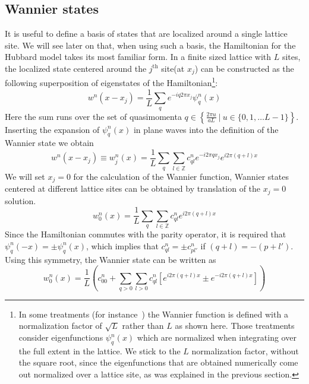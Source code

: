 \subsection{Wannier states} 
\label{sec:1Dlattice}

It is useful to define a basis of states that are localized around a single
lattice site.  We will see later on that, when using such a basis, the
Hamiltonian for the Hubbard model takes its most familiar form.  In a finite
sized lattice with $L$ sites,  the localized state centered around the
$j^{\text{th}}$ site(at $x_{j}$) can be constructed as the following
superposition of eigenstates of the Hamiltonian\footnote{In some treatments
(for instance~\cite{salomon2013many}) the Wannier function is defined with a
normalization factor of $\sqrt{L}$  rather than $L$ as shown here.   Those
treatments consider eigenfunctions $\psi_{q}^{n}(x)$ which are normalized when
integrating over the full extent in the lattice.  We stick to the $L$
normalization factor, without the square root, since the eigenfunctions that
are obtained numerically come out normalized over a lattice site, as was
explained in the previous section.}: 
\begin{equation} w^{n}(x-x_{j}) =  \frac{1}{L} \sum_{q}  e^{-i q 2\pi x_{j} }
\psi_{q}^{n}(x) \label{eq:wannier} 
\end{equation} 
Here the sum runs over the
set of quasimomenta  $q \in \left\lbrace \frac{2\pi u}{a L} \ |\  u \in \lbrace
0,1,\ldots L-1 \rbrace \right\rbrace$.  Inserting the expansion of
$\psi_{q}^{n}(x)$ in plane waves into the definition of the Wannier state we
obtain 
\begin{equation}
 w^{n}(x-x_{j}) \equiv w_{j}^{n}(x)= 
    \frac{1}{L} \sum_{q}  
   \sum_{l \in \mathbb{Z}} 
   c_{ql}^{n} 
   e^{-i 2\pi q x_{j} }  
   e^{i 2\pi(q+l)x} 
\end{equation}
We will set $x_{j}=0$ for the calculation of the Wannier function,   Wannier
states centered at different lattice sites can be obtained by translation of
the $x_{j}=0$ solution. 
\begin{equation}
  w_{0}^{n}(x)= 
    \frac{1}{L} \sum_{q}  
   \sum_{l \in \mathbb{Z}} 
   c_{ql}^{n} 
   e^{i 2\pi(q+l)x} 
\end{equation}
Since the Hamiltonian commutes with the parity operator, it is required that
$\psi_{q}^{n}(-x) = \pm \psi_{q}^{n}(x)$, which implies that $c_{ql}^{n} = \pm
c_{pl'}^{n}$ if  $(q+l) = -(p+l')$.  Using this symmetry, the Wannier state
can be written as 
\begin{equation}
  w_{0}^{n}(x)= 
    \frac{1}{L} \left(
   c_{00}^{n} + 
    \sum_{q>0} 
   \sum_{l > 0 } 
   c_{ql}^{n} \left[ e^{i 2\pi(q+l)x} \pm e^{-i 2\pi(q+l)x } \right] \right)
\end{equation}
